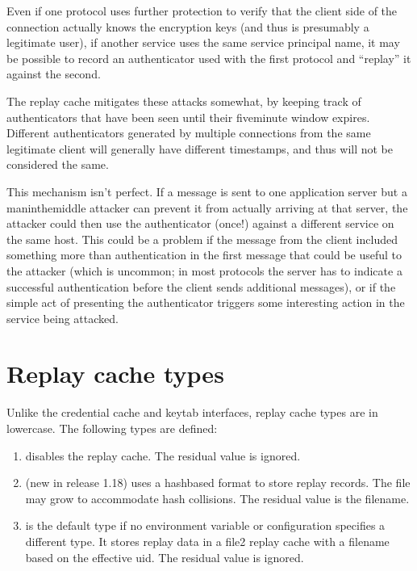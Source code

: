 \documentclass[letterpaper,10pt,english]{sphinxmanual}
\begin{document}
\sphinxAtStartPar
Even if one protocol uses further protection to verify that the client
side of the connection actually knows the encryption keys (and thus is
presumably a legitimate user), if another service uses the same
service principal name, it may be possible to record an authenticator
used with the first protocol and “replay” it against the second.

\sphinxAtStartPar
The replay cache mitigates these attacks somewhat, by keeping track of
authenticators that have been seen until their five\sphinxhyphen{}minute window
expires.  Different authenticators generated by multiple connections
from the same legitimate client will generally have different
timestamps, and thus will not be considered the same.

\sphinxAtStartPar
This mechanism isn’t perfect.  If a message is sent to one application
server but a man\sphinxhyphen{}in\sphinxhyphen{}the\sphinxhyphen{}middle attacker can prevent it from actually
arriving at that server, the attacker could then use the authenticator
(once!) against a different service on the same host.  This could be a
problem if the message from the client included something more than
authentication in the first message that could be useful to the
attacker (which is uncommon; in most protocols the server has to
indicate a successful authentication before the client sends
additional messages), or if the simple act of presenting the
authenticator triggers some interesting action in the service being
attacked.


\section{Replay cache types}
\label{\detokenize{basic/rcache_def:replay-cache-types}}
\sphinxAtStartPar
Unlike the credential cache and keytab interfaces, replay cache types
are in lowercase.  The following types are defined:
\begin{enumerate}
%
\item {} 
\sphinxAtStartPar
{} disables the replay cache.  The residual value is ignored.

\item {} 
\sphinxAtStartPar
{} (new in release 1.18) uses a hash\sphinxhyphen{}based format to store
replay records.  The file may grow to accommodate hash collisions.
The residual value is the filename.

\item {} 
\sphinxAtStartPar
{} is the default type if no environment variable or
configuration specifies a different type.  It stores replay data in
a file2 replay cache with a filename based on the effective uid.
The residual value is ignored.

\end{enumerate}
\end{document}
